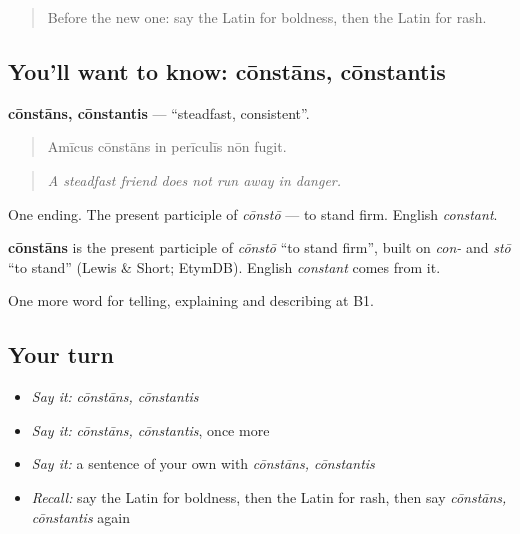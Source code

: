 \label{lesson:LA-C509-constans}



\begin{quote}
Before the new one: say the Latin for boldness, then the Latin for rash.
\end{quote}

\subsection*{You'll want to know: cōnstāns, cōnstantis}
\textbf{cōnstāns, cōnstantis} — \textquotedblleft{}steadfast, consistent\textquotedblright{}.

\begin{quote}
Amīcus cōnstāns in perīculīs nōn fugit.
\end{quote}

\begin{quote}
\emph{A steadfast friend does not run away in danger.}
\end{quote}

One ending. The present participle of \emph{cōnstō} — to stand firm. English \emph{constant}.

\begin{cousinweb}
\textbf{cōnstāns} is the present participle of \emph{cōnstō} \textquotedblleft{}to stand firm\textquotedblright{}, built on \emph{con-} and \emph{stō} \textquotedblleft{}to stand\textquotedblright{} (Lewis \& Short; EtymDB). English \emph{constant} comes from it.
\end{cousinweb}

\begin{grammarlens}[title={What you've built}]
One more word for telling, explaining and describing at B1.
\end{grammarlens}

\subsection*{Your turn}
\begin{itemize}
\raggedright
  \item \emph{Say it:} \emph{cōnstāns, cōnstantis}
  \item \emph{Say it:} \emph{cōnstāns, cōnstantis}, once more
  \item \emph{Say it:} a sentence of your own with \emph{cōnstāns, cōnstantis}
  \item \emph{Recall:} say the Latin for boldness, then the Latin for rash, then say \emph{cōnstāns, cōnstantis} again
\end{itemize}

